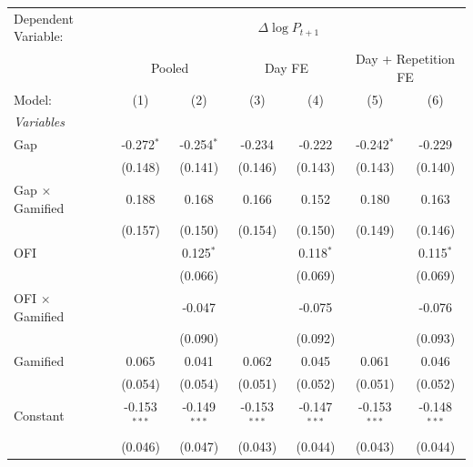 \begingroup
\centering
\begin{tabular}{lcccccc}
   \tabularnewline \midrule \midrule
   Dependent Variable: & \multicolumn{6}{c}{$\Delta \log P_{t+1}$}\\
    & \multicolumn{2}{c}{Pooled} & \multicolumn{2}{c}{Day FE} & \multicolumn{2}{c}{Day + Repetition FE} \\ 
   Model:                 & (1)            & (2)            & (3)            & (4)            & (5)            & (6)\\  
   \midrule
   \emph{Variables}\\
   Gap                    & -0.272$^{*}$   & -0.254$^{*}$   & -0.234         & -0.222         & -0.242$^{*}$   & -0.229\\   
                          & (0.148)        & (0.141)        & (0.146)        & (0.143)        & (0.143)        & (0.140)\\   
   Gap $\times$ Gamified  & 0.188          & 0.168          & 0.166          & 0.152          & 0.180          & 0.163\\   
                          & (0.157)        & (0.150)        & (0.154)        & (0.150)        & (0.149)        & (0.146)\\   
   OFI                    &                & 0.125$^{*}$    &                & 0.118$^{*}$    &                & 0.115$^{*}$\\   
                          &                & (0.066)        &                & (0.069)        &                & (0.069)\\   
   OFI $\times$ Gamified  &                & -0.047         &                & -0.075         &                & -0.076\\   
                          &                & (0.090)        &                & (0.092)        &                & (0.093)\\   
   Gamified               & 0.065          & 0.041          & 0.062          & 0.045          & 0.061          & 0.046\\   
                          & (0.054)        & (0.054)        & (0.051)        & (0.052)        & (0.051)        & (0.052)\\   
   Constant               & -0.153$^{***}$ & -0.149$^{***}$ & -0.153$^{***}$ & -0.147$^{***}$ & -0.153$^{***}$ & -0.148$^{***}$\\   
                          & (0.046)        & (0.047)        & (0.043)        & (0.044)        & (0.043)        & (0.044)\\   

\end{tabular}
